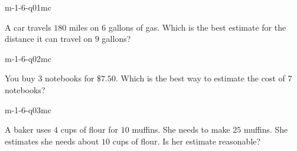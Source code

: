 

\begin{practiceQuestion}{m-1-6-q01}{mc}
\begin{questionText}
A car travels $180$ miles on $6$ gallons of gas. Which is the best estimate for the distance it can travel on $9$ gallons?
\end{questionText}
\end{practiceQuestion}

\begin{practiceQuestion}{m-1-6-q02}{mc}
\begin{questionText}
You buy $3$ notebooks for $\$7.50$. Which is the best way to estimate the cost of $7$ notebooks?
\end{questionText}
\end{practiceQuestion}

\begin{practiceQuestion}{m-1-6-q03}{mc}
\begin{questionText}
A baker uses $4$ cups of flour for $10$ muffins. She needs to make $25$ muffins. She estimates she needs about $10$ cups of flour. Is her estimate reasonable?
\end{questionText}
\end{practiceQuestion}

